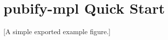 \documentclass{article}
\begin{document}
\section*{pubify-mpl Quick Start}

[A simple exported example figure.]
\end{document}
